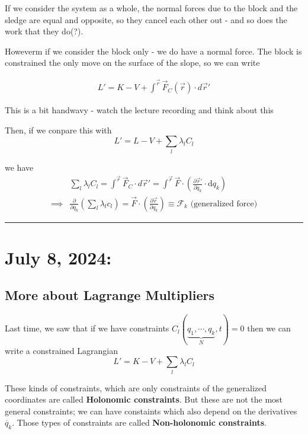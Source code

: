 \documentclass[11pt]{article}
\begin{document}
If we consider the system as a whole, the normal forces due to the block and the sledge are equal and opposite, so they cancel each other out - and so does the work that they do(?).

\vskip 0.5cm
Howeverm if we consider the block only - we do have a normal force. The block is constrained the only move on the surface of the slope, so we can write 

\begin{align*}
  L' = K - V + \int^{\vec{r}} \vec{F}_C(\vec{r}) \cdot d\vec{r}'
\end{align*}

\begin{thought}
  {This is a bit handwavy - watch the lecture recording and think about this}
\end{thought}

Then, if we conpare this with 
\[ L' = L - V + \sum_{l} \lambda_l C_l \]

we have 
\begin{align*}
  &\sum_{l} \lambda_l C_l = \int^{\vec{r}} \vec{F}_C \cdot d\vec{r}' = \int^{\vec{r}} \vec{F} \cdot \left( \frac{\partial \vec{r}'}{\partial q_k} \cdot \mathrm{d}q_k \right) \\
  \implies& \frac{\partial}{\partial q_k} \left( \sum_{l} \lambda_l c_l \right) = \vec{F} \cdot \left( \frac{\partial \vec{r}}{\partial q_{k}} \right) \equiv \mathcal{F}_k \text{  (generalized force)}
\end{align*}

\hrule

\pagebreak
\section{July 8, 2024:}

\vskip 0.5cm
\subsection{More about Lagrange Multipliers}
Last time, we saw that if we have constraints $C_l \left(\underbrace{q_1, \cdots, q_k}_{N}, t\right) = 0$ then we can write a constrained Lagrangian
\[ L' = K - V + \sum_{l} \lambda_l C_l \]

These kinds of constraints, which are only constraints of the generalized coordinates are called \textbf{Holonomic constraints}. But these are not the most general constraints; we can have constaints which also depend on the derivatives $\dot{q_{k}}$. Those types of constraints are called \textbf{Non-holonomic constraints}.
\end{document}
